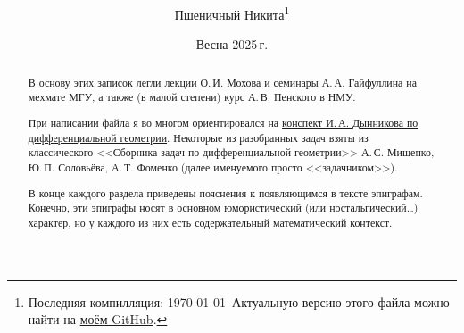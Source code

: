 \documentclass[a4paper, twoside, leqno, 11pt]{article}
\begin{document}
\title{\bfseries\scshape\course}
\date{Весна 2025\,г.}
\author{Пшеничный Никита\thanks{Последняя компилляция: \today\ Актуальную версию этого файла можно найти на \href{https://github.com/pshenikita/Differential-Geometry}{моём GitHub}.}}

\maketitle
\begin{abstract}
	В основу этих записок легли лекции О.\,И. Мохова и семинары А.\,А. Гайфуллина на мехмате МГУ, а также (в малой степени) курс А.\,В. Пенского в НМУ.

	При написании файла я во многом ориентировался на \href{https://teach-in.ru/file/methodical/pdf/classical-difgeom-dynnikov-M.pdf}{конспект И.\,А. Дынникова по дифференциальной геометрии}. Некоторые из разобранных задач взяты из классического <<Сборника задач по дифференциальной геометрии>> А.\,С. Мищенко, Ю.\,П. Соловьёва, А.\,Т. Фоменко (далее именуемого просто <<задачником>>).

	В конце каждого раздела приведены пояснения к появляющимся в тексте эпиграфам. Конечно, эти эпиграфы носят в основном юмористический (или ностальгический\ldots) характер, но у каждого из них есть содержательный математический контекст.
\end{abstract}

\tableofcontents




\end{document}
